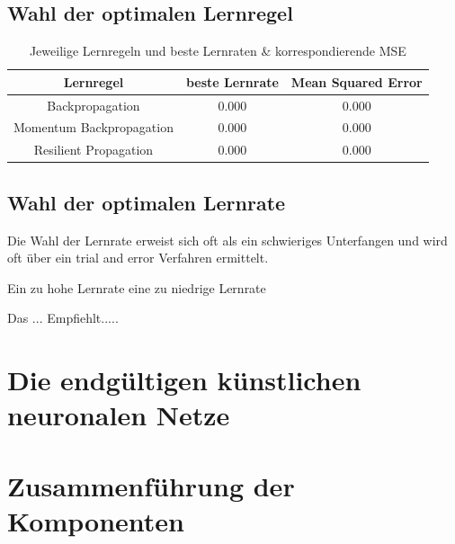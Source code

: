 \subsection{Wahl der optimalen Lernregel} %

\begin{table}
  \centering
  \begin{tabular}{|c|c|c|}
  \hline 
  \rule[0ex]{0pt}{2.5ex} Lernregel & beste Lernrate & Mean Squared Error \\ 
  \hline 
  \rule[0ex]{0pt}{2.5ex} Backpropagation & 0.000 & 0.000 \\ 
  \hline 
  \rule[0ex]{0pt}{2.5ex} Momentum Backpropagation & 0.000 & 0.000\\ 
  \hline 
  \rule[0ex]{0pt}{2.5ex} Resilient Propagation & 0.000 & 0.000 \\ 
  \hline 
  \end{tabular} 
  \caption{Jeweilige Lernregeln und beste Lernraten \& korrespondierende MSE}
  \label{tab:tab3}
\end{table}


\subsection{Wahl der optimalen Lernrate}
\label{subsection:Wahl der optimalen Lernrate}

Die Wahl der Lernrate erweist sich oft als ein schwieriges Unterfangen und wird oft über ein trial and error Verfahren ermittelt. 

Ein zu hohe Lernrate 
eine zu niedrige Lernrate


Das ... Empfiehlt.....


\section{Die endgültigen künstlichen neuronalen Netze}


\section{Zusammenführung der Komponenten}
